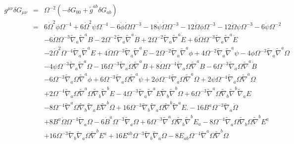 \documentclass[10pt,letterpaper]{article}
\numberwithin{equation}{section}
\begin{document}
\begin{eqnarray}
g^{\mu\nu}\delta G_{\mu\nu} &=& \Omega^{-2}( -\delta G_{00} + \tilde g^{ab}\delta G_{ab})
\nonumber\\
&=&6 \dot{\Omega}^2 \phi \Omega^{-4}
+ 6 \dot{\Omega}^2 \psi \Omega^{-4}
- 6 \dot{\phi} \dot{\Omega} \Omega^{-3}
- 18 \dot{\psi} \dot{\Omega} \Omega^{-3}
- 12 \ddot{\Omega} \phi \Omega^{-3}
- 12 \ddot{\Omega} \psi \Omega^{-3}
- 6 \ddot{\psi} \Omega^{-2}\nonumber\\
&& - 6 \dot{\Omega} \Omega^{-3} \tilde{\nabla}_{a}\tilde{\nabla}^{a}B
- 2 \Omega^{-2} \tilde{\nabla}_{a}\tilde{\nabla}^{a}\dot{B}
+ 2 \Omega^{-2} \tilde{\nabla}_{a}\tilde{\nabla}^{a}\ddot{E}
+ 6 \dot{\Omega} \Omega^{-3} \tilde{\nabla}_{a}\tilde{\nabla}^{a}\dot{E}\nonumber\\
&& - 2 \dot{\Omega}^2 \Omega^{-4} \tilde{\nabla}_{a}\tilde{\nabla}^{a}E
+ 4 \ddot{\Omega} \Omega^{-3} \tilde{\nabla}_{a}\tilde{\nabla}^{a}E
- 2 \Omega^{-2} \tilde{\nabla}_{a}\tilde{\nabla}^{a}\phi
+ 4 \Omega^{-2} \tilde{\nabla}_{a}\tilde{\nabla}^{a}\psi
- 4 \phi \Omega^{-3} \tilde{\nabla}_{a}\tilde{\nabla}^{a}\Omega\nonumber\\
&& - 4 \psi \Omega^{-3} \tilde{\nabla}_{a}\tilde{\nabla}^{a}\Omega
- 16 \Omega^{-3} \tilde{\nabla}_{a}\dot{\Omega} \tilde{\nabla}^{a}B
+ 8 \dot{\Omega} \Omega^{-4} \tilde{\nabla}_{a}\Omega \tilde{\nabla}^{a}B
- 6 \Omega^{-3} \tilde{\nabla}_{a}\Omega \tilde{\nabla}^{a}\dot{B}\nonumber\\
&& - 6 \Omega^{-3} \tilde{\nabla}_{a}\Omega \tilde{\nabla}^{a}\phi
+ 6 \Omega^{-3} \tilde{\nabla}_{a}\Omega \tilde{\nabla}^{a}\psi
+ 2 \phi \Omega^{-4} \tilde{\nabla}_{a}\Omega \tilde{\nabla}^{a}\Omega
+ 2 \psi \Omega^{-4} \tilde{\nabla}_{a}\Omega \tilde{\nabla}^{a}\Omega\nonumber\\
&& + 2 \Omega^{-4} \tilde{\nabla}_{a}\Omega \tilde{\nabla}^{a}\Omega \tilde{\nabla}_{b}\tilde{\nabla}^{b}E
- 4 \Omega^{-3} \tilde{\nabla}_{a}\tilde{\nabla}^{a}E \tilde{\nabla}_{b}\tilde{\nabla}^{b}\Omega
+ 6 \Omega^{-3} \tilde{\nabla}^{a}\Omega \tilde{\nabla}_{b}\tilde{\nabla}^{b}\tilde{\nabla}_{a}E\nonumber\\
&& - 8 \Omega^{-4} \tilde{\nabla}^{a}\Omega \tilde{\nabla}_{b}\tilde{\nabla}_{a}E \tilde{\nabla}^{b}\Omega
+ 16 \Omega^{-3} \tilde{\nabla}_{b}\tilde{\nabla}_{a}\Omega \tilde{\nabla}^{b}\tilde{\nabla}^{a}E.
-16 B^{a} \Omega^{-3} \tilde{\nabla}_{a}\dot{\Omega}
\nonumber\\
&&+ 8 B^{a} \dot{\Omega} \Omega^{-4} \tilde{\nabla}_{a}\Omega
- 6 \dot{B}^{a} \Omega^{-3} \tilde{\nabla}_{a}\Omega
+ 6 \Omega^{-3} \tilde{\nabla}^{a}\Omega \tilde{\nabla}_{b}\tilde{\nabla}^{b}E_{a}- 8 \Omega^{-4} \tilde{\nabla}_{a}\Omega \tilde{\nabla}_{b}\Omega \tilde{\nabla}^{b}E^{a}
\nonumber\\
&&+ 16 \Omega^{-3} \tilde{\nabla}_{b}\tilde{\nabla}_{a}\Omega \tilde{\nabla}^{b}E^{a}
+16 E^{ab} \Omega^{-3} \tilde{\nabla}_{b}\tilde{\nabla}_{a}\Omega
- 8 E_{ab} \Omega^{-4} \tilde{\nabla}^{a}\Omega \tilde{\nabla}^{b}\Omega
\end{eqnarray}
%
%
\end{document}
